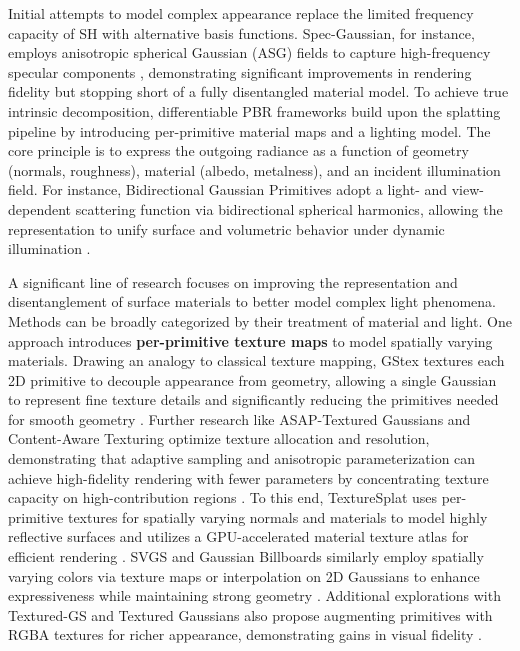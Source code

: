 \documentclass[11pt,a4paper]{article}
\begin{document}
Initial attempts to model complex appearance replace the limited frequency capacity of SH with alternative basis functions. Spec-Gaussian, for instance, employs anisotropic spherical Gaussian (ASG) fields to capture high-frequency specular components \cite{arxiv:2402.15870v1}, demonstrating significant improvements in rendering fidelity but stopping short of a fully disentangled material model. To achieve true intrinsic decomposition, differentiable PBR frameworks build upon the splatting pipeline by introducing per-primitive material maps and a lighting model. The core principle is to express the outgoing radiance as a function of geometry (normals, roughness), material (albedo, metalness), and an incident illumination field. For instance, Bidirectional Gaussian Primitives adopt a light- and view-dependent scattering function via bidirectional spherical harmonics, allowing the representation to unify surface and volumetric behavior under dynamic illumination \cite{arxiv:2408.13370v1}.

A significant line of research focuses on improving the representation and disentanglement of surface materials to better model complex light phenomena. Methods can be broadly categorized by their treatment of material and light. One approach introduces \textbf{per-primitive texture maps} to model spatially varying materials. Drawing an analogy to classical texture mapping, GStex textures each 2D primitive to decouple appearance from geometry, allowing a single Gaussian to represent fine texture details and significantly reducing the primitives needed for smooth geometry \cite{arxiv:2409.12954v1}. Further research like ASAP-Textured Gaussians and Content-Aware Texturing optimize texture allocation and resolution, demonstrating that adaptive sampling and anisotropic parameterization can achieve high-fidelity rendering with fewer parameters by concentrating texture capacity on high-contribution regions \cite{arxiv:2405.17083v2,arxiv:2512.02621v1}. To this end, TextureSplat uses per-primitive textures for spatially varying normals and materials to model highly reflective surfaces and utilizes a GPU-accelerated material texture atlas for efficient rendering \cite{arxiv:2506.13348v2}. SVGS and Gaussian Billboards similarly employ spatially varying colors via texture maps or interpolation on 2D Gaussians to enhance expressiveness while maintaining strong geometry \cite{arxiv:2411.18966v2,arxiv:2412.12734v1}. Additional explorations with Textured-GS and Textured Gaussians also propose augmenting primitives with RGBA textures for richer appearance, demonstrating gains in visual fidelity \cite{arxiv:2407.09733v2,arxiv:2411.18625v2}.
\end{document}
